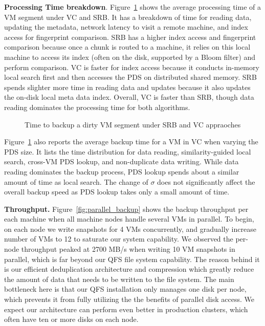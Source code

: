 {\bf Processing Time breakdown}.
Figure~\ref{fig:vc_srb_combined} shows
the  average  processing  time of  a VM segment under VC and SRB. 
It has a breakdown of time for reading data, updating the metadata, network latency to visit
a remote machine, and index access for fingerprint comparison.
SRB has a higher index access and fingerprint comparison because once a chunk is routed to a machine,
it relies on this local machine to access its index (often on the disk, supported by a Bloom filter) 
and perform comparison.
VC is faster for index access because it conducts in-memory local search first and then
accesses  the PDS on distributed shared memory.  
SRB spends  slighter more time in  reading data and updates because it also updates the on-disk
local meta data index.
Overall,  VC is faster than SRB, though data reading dominates the processing time for both algorithms.

\begin{figure}[htbp]
  \centering
  \caption{Time to backup a dirty VM segment under SRB and VC appraoches}
  \label{fig:vc_srb_combined}
\end{figure}


Figure~\ref{fig:vc_srb_combined} also reports the average backup time for a VM in VC when
varying the PDS size.  It lists the time distribution for data reading,
similarity-guided local search, cross-VM PDS lookup, and non-duplicate data writing. 
While data reading dominates the backup process, PDS lookup spends about a similar amount
of time as local search.
The change of $\sigma$ does not significantly affect the overall backup speed as
PDS lookup takes only a small amount of time.



{\bf Throughput.}
Figure~\ref{fig:parallel_backup} shows the  backup throughput per each machine when all machine nodes 
handle  several VMs in parallel.
To begin, on each node we write snapshots for 4 VMs concurrently, and gradually 
increase number of VMs to 12 to saturate our system capability. We observed 
the per-node throughput peaked at 2700 MB/s when writing 10 VM snapshots in parallel, 
which is far beyond our QFS file system capability. The reason behind it is our efficient
deduplication architecture and compression which greatly reduce the amount of data that needs to be written to
the file system. The main bottleneck here is that our QFS installation only
manages one disk per node, which prevents it from fully utilizing the the
benefits of parallel disk access. We expect our architecture can
perform even better in production clusters, which often have ten or more disks on each node.

